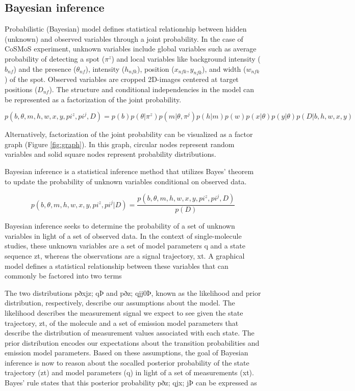 \subsection{Bayesian inference}

Probabilistic (Bayesian) model defines statistical relationship between hidden (unknown) and observed variables through a joint probability. In the case of CoSMoS experiment, unknown variables include global variables such as average probability of detecting a spot ($\pi^z$) and local variables like background intensity ($b_{nf}$) and the presence ($\theta_{nf}$), intensity ($h_{nfk}$), position ($x_{nfk}, y_{nfk}$), and width ($w_{nfk}$) of the spot. Observed variables are cropped 2D-images centered at target positions ($D_{nf}$). The structure and conditional independencies in the model can be represented as a factorization of the joint probability.

\textbf{\begin{equation*}
    p(b,\theta,m,h,w,x,y,pi^z,pi^j,D) = p(b)p(\theta|\pi^z)p(m|\theta,\pi^j)p(h|m)p(w)p(x|\theta)p(y|\theta)p(D|b,h,w,x,y)
\end{equation*}}

Alternatively, factorization of the joint probability can be visualized as a factor graph (Figure \ref{fig:graph}). In this graph, circular nodes represent random variables and solid square nodes represent probability distributions.

Bayesian inference is a statistical inference method that utilizes Bayes' theorem to update the probability of unknown variables conditional on observed data.

\textbf{\begin{equation*}
    p(b,\theta,m,h,w,x,y,pi^z,pi^j|D) = 
    \dfrac{p(b,\theta,m,h,w,x,y,pi^z,pi^j,D)}{p(D)}
\end{equation*}}

Bayesian inference seeks to determine the probability of a set of unknown
variables in light of a set of observed data. In the context of single-molecule
studies, these unknown variables are a set of model parameters q and a state
sequence zt, whereas the observations are a signal trajectory, xt. A graphical
model defines a statistical relationship between these variables that can
commonly be factored into two terms

The two distributions pðxjz; qÞ and pðz; qjj0Þ, known as the likelihood and
prior distribution, respectively, describe our assumptions about the model.
The likelihood describes the measurement signal we expect to see given
the state trajectory, zt, of the molecule and a set of emission model parameters that describe the distribution of measurement values associated
with each state. The prior distribution encodes our expectations about the
transition probabilities and emission model parameters. Based on these assumptions, the goal of Bayesian inference is now to reason about the socalled posterior probability of the state trajectory (zt) and model parameters
(q) in light of a set of measurements (xt). Bayes’ rule states that this posterior probability pðz; qjx; jÞ can be expressed as

